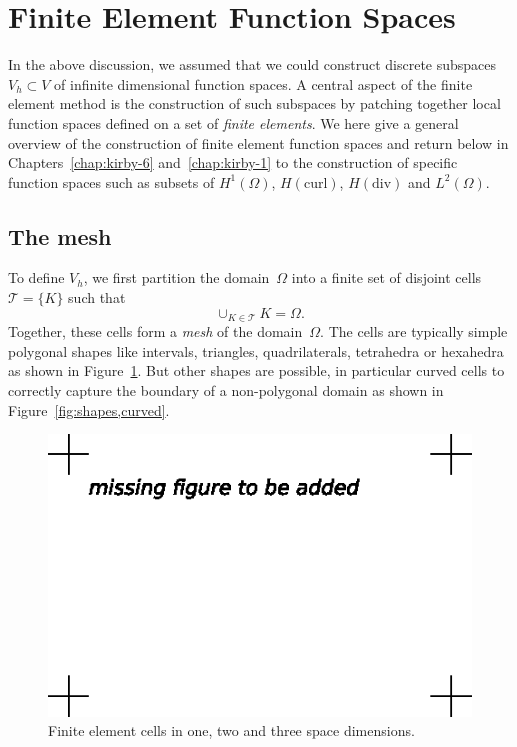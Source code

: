 \section{Finite Element Function Spaces}

In the above discussion, we assumed that we could construct discrete
subspaces $V_h \subset V$ of infinite dimensional function spaces.  A
central aspect of the finite element method is the construction of
such subspaces by patching together local function spaces defined on a
set of \emph{finite elements}. We here give a general overview of the
construction of finite element function spaces and return below in
Chapters~\ref{chap:kirby-6} and~\ref{chap:kirby-1} to the construction of
specific function spaces such as subsets of $H^1(\Omega)$,
$H(\mathrm{curl})$, $H(\mathrm{div})$ and $L^2(\Omega)$.

\subsection{The mesh}

To define $V_h$, we first partition the domain~$\Omega$ into a finite
set of disjoint cells $\mathcal{T} = \{K\}$ such that
\begin{displaymath}
  \cup_{K\in\mathcal{T}} K = \Omega.
\end{displaymath}
Together, these cells form a \emph{mesh} of the domain~$\Omega$. The
cells are typically simple polygonal shapes like intervals, triangles,
quadrilaterals, tetrahedra or hexahedra as shown in
Figure~\ref{fig:shapes}. But other shapes are possible, in particular
curved cells to correctly capture the boundary of a non-polygonal
domain as shown in Figure~\ref{fig:shapes,curved}.

\begin{figure}
  \begin{center}
    \includegraphics[width=\largewidth]{chapters/kirby-7/eps/missing-figure.eps}
    \caption{Finite element cells in one, two and three space dimensions.}
    \label{fig:shapes}
  \end{center}
\end{figure}

